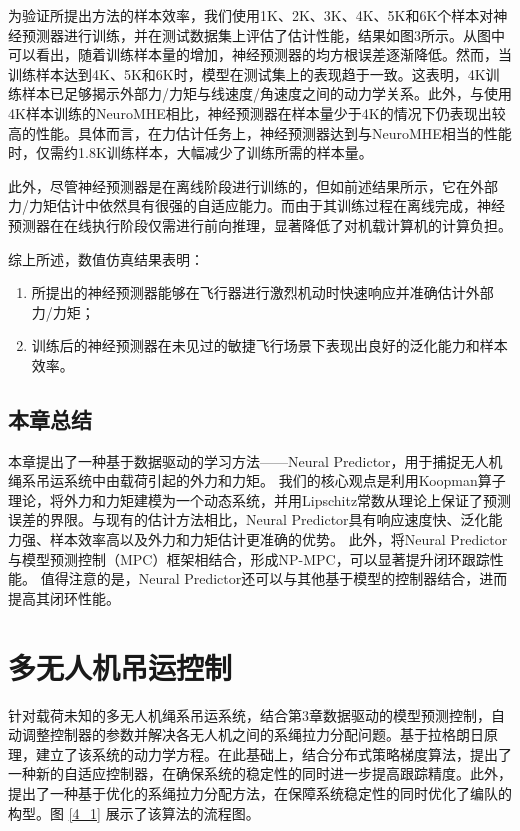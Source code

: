 \documentclass[lang=chs, degree=master, blindreview=false, winfonts=true]{yanputhesis}
\begin{document}
为验证所提出方法的样本效率，我们使用1K、2K、3K、4K、5K和6K个样本对神经预测器进行训练，并在测试数据集上评估了估计性能，结果如图3所示。从图中可以看出，随着训练样本量的增加，神经预测器的均方根误差逐渐降低。然而，当训练样本达到4K、5K和6K时，模型在测试集上的表现趋于一致。这表明，4K训练样本已足够揭示外部力/力矩与线速度/角速度之间的动力学关系。此外，与使用4K样本训练的NeuroMHE相比，神经预测器在样本量少于4K的情况下仍表现出较高的性能。具体而言，在力估计任务上，神经预测器达到与NeuroMHE相当的性能时，仅需约1.8K训练样本，大幅减少了训练所需的样本量。

此外，尽管神经预测器是在离线阶段进行训练的，但如前述结果所示，它在外部力/力矩估计中依然具有很强的自适应能力。而由于其训练过程在离线完成，神经预测器在在线执行阶段仅需进行前向推理，显著降低了对机载计算机的计算负担。

综上所述，数值仿真结果表明：
\begin{enumerate}
    \item 所提出的神经预测器能够在飞行器进行激烈机动时快速响应并准确估计外部力/力矩；
    \item 训练后的神经预测器在未见过的敏捷飞行场景下表现出良好的泛化能力和样本效率。
\end{enumerate}


\section{本章总结}
本章提出了一种基于数据驱动的学习方法——Neural Predictor，用于捕捉无人机绳系吊运系统中由载荷引起的外力和力矩。 我们的核心观点是利用Koopman算子理论，将外力和力矩建模为一个动态系统，并用Lipschitz常数从理论上保证了预测误差的界限。与现有的估计方法相比，Neural Predictor具有响应速度快、泛化能力强、样本效率高以及外力和力矩估计更准确的优势。 此外，将Neural Predictor与模型预测控制（MPC）框架相结合，形成NP-MPC，可以显著提升闭环跟踪性能。 值得注意的是，Neural Predictor还可以与其他基于模型的控制器结合，进而提高其闭环性能。



\cleardoublepage

\chapter{多无人机吊运控制}

针对载荷未知的多无人机绳系吊运系统，结合第3章数据驱动的模型预测控制，自动调整控制器的参数并解决各无人机之间的系绳拉力分配问题。基于拉格朗日原理，建立了该系统的动力学方程。在此基础上，结合分布式策略梯度算法，提出了一种新的自适应控制器，在确保系统的稳定性的同时进一步提高跟踪精度。此外，提出了一种基于优化的系绳拉力分配方法，在保障系统稳定性的同时优化了编队的构型。图 \ref{4_1} 展示了该算法的流程图。
\end{document}
